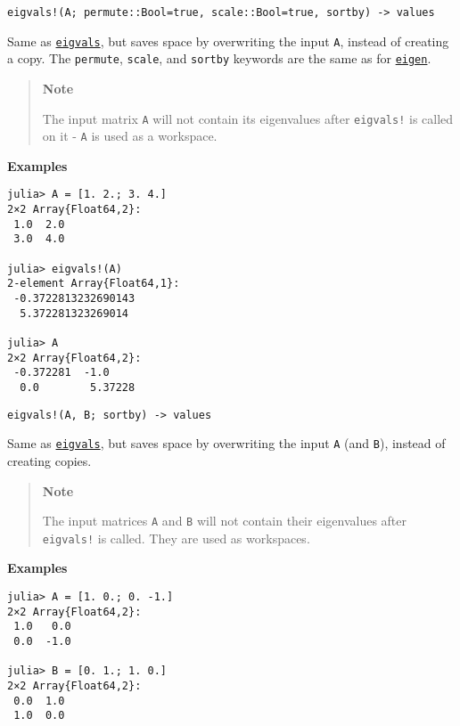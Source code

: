 \begin{adjustwidth}{2em}{0pt}


\begin{verbatim}
eigvals!(A; permute::Bool=true, scale::Bool=true, sortby) -> values
\end{verbatim}

Same as \hyperlink{12334018763942871611}{\texttt{eigvals}}, but saves space by overwriting the input \texttt{A}, instead of creating a copy. The \texttt{permute}, \texttt{scale}, and \texttt{sortby} keywords are the same as for \hyperlink{11056016707394839114}{\texttt{eigen}}.

\begin{quote}
\textbf{Note}

The input matrix \texttt{A} will not contain its eigenvalues after \texttt{eigvals!} is called on it - \texttt{A} is used as a workspace.

\end{quote}
\textbf{Examples}


\begin{verbatim}
julia> A = [1. 2.; 3. 4.]
2×2 Array{Float64,2}:
 1.0  2.0
 3.0  4.0

julia> eigvals!(A)
2-element Array{Float64,1}:
 -0.3722813232690143
  5.372281323269014

julia> A
2×2 Array{Float64,2}:
 -0.372281  -1.0
  0.0        5.37228
\end{verbatim}




\begin{lstlisting}
eigvals!(A, B; sortby) -> values
\end{lstlisting}

Same as \hyperlink{12334018763942871611}{\texttt{eigvals}}, but saves space by overwriting the input \texttt{A} (and \texttt{B}), instead of creating copies.

\begin{quote}
\textbf{Note}

The input matrices \texttt{A} and \texttt{B} will not contain their eigenvalues after \texttt{eigvals!} is called. They are used as workspaces.

\end{quote}
\textbf{Examples}


\begin{verbatim}
julia> A = [1. 0.; 0. -1.]
2×2 Array{Float64,2}:
 1.0   0.0
 0.0  -1.0

julia> B = [0. 1.; 1. 0.]
2×2 Array{Float64,2}:
 0.0  1.0
 1.0  0.0


\end{verbatim}
\end{adjustwidth}
